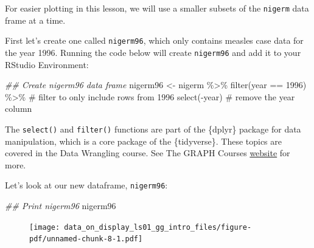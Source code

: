 \documentclass[
  letterpaper,
  DIV=11,
  numbers=noendperiod]{scrreprt}
\newenvironment{Shaded}{\begin{snugshade}}{\end{snugshade}}
\newcommand{\CommentTok}[1]{\textcolor[rgb]{0.37,0.37,0.37}{#1}}
\newcommand{\DecValTok}[1]{\textcolor[rgb]{0.68,0.00,0.00}{#1}}
\newcommand{\DocumentationTok}[1]{\textcolor[rgb]{0.37,0.37,0.37}{\textit{#1}}}
\newcommand{\FunctionTok}[1]{\textcolor[rgb]{0.28,0.35,0.67}{#1}}
\newcommand{\NormalTok}[1]{\textcolor[rgb]{0.00,0.23,0.31}{#1}}
\newcommand{\OtherTok}[1]{\textcolor[rgb]{0.00,0.23,0.31}{#1}}
\newcommand{\SpecialCharTok}[1]{\textcolor[rgb]{0.37,0.37,0.37}{#1}}
\begin{document}
For easier plotting in this lesson, we will use a smaller subsets of the
\texttt{nigerm} data frame at a time.

First let's create one called \texttt{nigerm96}, which only contains
measles case data for the year 1996. Running the code below will create
\texttt{nigerm96} and add it to your RStudio Environment:

\begin{Shaded}
\begin{Highlighting}[]
\DocumentationTok{\#\# Create nigerm96 data frame}
\NormalTok{nigerm96 }\OtherTok{\textless{}{-}}\NormalTok{ nigerm }\SpecialCharTok{\%\textgreater{}\%}   
  \FunctionTok{filter}\NormalTok{(year }\SpecialCharTok{==} \DecValTok{1996}\NormalTok{)  }\SpecialCharTok{\%\textgreater{}\%} \CommentTok{\# filter to only include rows from 1996}
  \FunctionTok{select}\NormalTok{(}\SpecialCharTok{{-}}\NormalTok{year) }\CommentTok{\# remove the year column}
\end{Highlighting}
\end{Shaded}

\begin{tcolorbox}[enhanced jigsaw, colframe=quarto-callout-note-color-frame, rightrule=.15mm, opacityback=0, breakable, coltitle=black, colbacktitle=quarto-callout-note-color!10!white, bottomrule=.15mm, leftrule=.75mm, toprule=.15mm, arc=.35mm, bottomtitle=1mm, colback=white, left=2mm, opacitybacktitle=0.6, titlerule=0mm, title=\textcolor{quarto-callout-note-color}{\faInfo}\hspace{0.5em}{Reminder}, toptitle=1mm]

The \texttt{select()} and \texttt{filter()} functions are part of the
\{dplyr\} package for data manipulation, which is a core package of the
\{tidyverse\}. These topics are covered in the Data Wrangling course.
See The GRAPH Courses \href{https://thegraphcourses.org/}{website} for
more.

\end{tcolorbox}

Let's look at our new dataframe, \texttt{nigerm96}:

\begin{Shaded}
\begin{Highlighting}[]
\DocumentationTok{\#\# Print nigerm96}
\NormalTok{nigerm96}
\end{Highlighting}
\end{Shaded}

\begin{figure}[H]

{\centering \texttt{[image: data\_on\_display\_ls01\_gg\_intro\_files/figure-pdf/unnamed-chunk-8-1.pdf]}

}

\end{figure}
\end{document}
